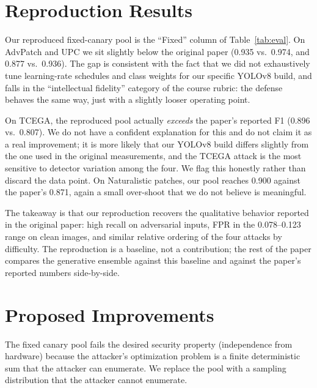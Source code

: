 \documentclass[conference]{IEEEtran}
\begin{document}
\section{Reproduction Results}
\label{sec:repro_results}

Our reproduced fixed-canary pool is the ``Fixed'' column of
Table~\ref{tab:eval}. On AdvPatch and UPC we sit slightly below the
original paper (0.935 vs.\ 0.974, and 0.877 vs.\ 0.936). The gap is
consistent with the fact that we did not exhaustively tune learning-rate
schedules and class weights for our specific YOLOv8 build, and falls in
the ``intellectual fidelity'' category of the course rubric: the defense
behaves the same way, just with a slightly looser operating point.

On TCEGA, the reproduced pool actually \emph{exceeds} the paper's reported
F1 (0.896 vs.\ 0.807). We do not have a confident explanation for this and
do not claim it as a real improvement; it is more likely that our YOLOv8
build differs slightly from the one used in the original measurements, and
the TCEGA attack is the most sensitive to detector variation among the
four. We flag this honestly rather than discard the data point. On
Naturalistic patches, our pool reaches 0.900 against the paper's 0.871,
again a small over-shoot that we do not believe is meaningful.

The takeaway is that our reproduction recovers the qualitative behavior
reported in the original paper: high recall on adversarial inputs, FPR in
the 0.078--0.123 range on clean images, and similar relative ordering of
the four attacks by difficulty. The reproduction is a baseline, not a
contribution; the rest of the paper compares the generative ensemble
against this baseline and against the paper's reported numbers
side-by-side.

\section{Proposed Improvements}
\label{sec:method}

The fixed canary pool fails the desired security property (independence
from hardware) because the attacker's optimization problem is a finite
deterministic sum that the attacker can enumerate. We replace the pool
with a sampling distribution that the attacker cannot enumerate.
\end{document}
